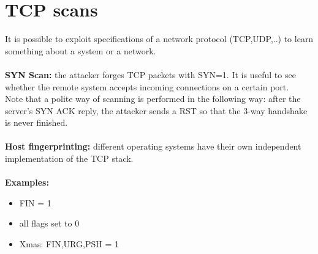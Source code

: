 \documentclass[10pt,a4paper]{book}
\begin{document}
\section{TCP scans}
It is possible to exploit specifications of a network protocol (TCP,UDP,..) to learn something about a system or a network.\\\\
\textbf{SYN Scan:} the attacker forges TCP packets with SYN=1. It is useful to see whether the remote system accepts incoming connections on a certain port.\\
Note that a polite way of scanning is performed in the following way: after the server's SYN ACK reply, the attacker sends a RST so that the 3-way handshake is never finished.\\\\
\textbf{Host fingerprinting:} different operating systems have their own independent implementation of the TCP stack.\\\\
\textbf{Examples:}
\begin{itemize}
\item FIN = 1
\item all flags set to 0
\item Xmas: FIN,URG,PSH = 1
\end{itemize}
\newpage
\end{document}
